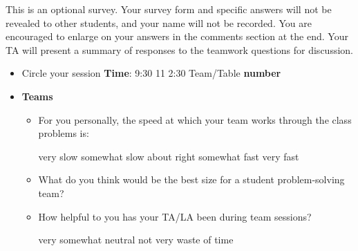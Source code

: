 \documentclass[handout]{mcs}
\begin{document}

This is an optional survey.  Your survey form and specific answers
will not be revealed to other students, and your name will not be
recorded.  You are encouraged to enlarge on your answers in the
comments section at the end.  Your TA will present a summary of
responses to the teamwork questions for discussion.

\begin{itemize}

\item 
Circle your session \textbf{Time}: \hspace{0.3in} 9:30 \hspace{0.3in}
11 \hspace{0.3in} 2:30 \hspace{0.5in} Team/Table \textbf{number}\examrule[0.5in]

\iffalse

\item Would you like the staff (Meyer/TA/LA) to present solutions to
  selected problems in class after your team has finished working on
  them?
\begin{center}
YES \hspace{1in} NO
\end{center}
\fi

\item \textbf{Teams}
\begin{itemize}

\item For you personally, the speed at which your team works through
  the class problems is:

\begin{center}
very slow\hspace{0.3in} somewhat slow\hspace{0.3in} about
right\hspace{0.3in} somewhat fast\hspace{0.3in} very fast
\end{center}

\item What do you think would be the best size for a student
  problem-solving team? \hfill\examrule[0.5in]


\item How helpful to you has your TA/LA been during team sessions?

\begin{center}
very\hspace{0.5in} somewhat \hspace{0.5in} neutral\hspace{0.5in} not
very \hspace{0.5in} waste of time
\end{center}


\end{itemize}
\end{itemize}
\end{document}
